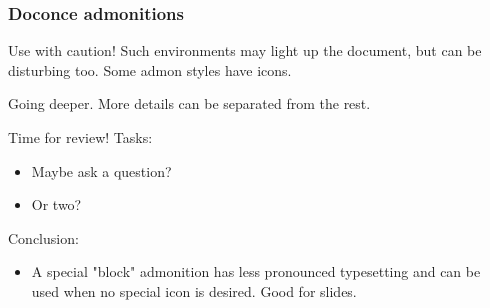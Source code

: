 \documentclass{beamer}
\newenvironment{graybox1admon}[1][]{\begin{block}{#1}}{\end{block}}
\begin{document}
\begin{frame}
\frametitle{Doconce admonitions}

\begin{graybox1admon}[Use with caution!]
Such environments may light up the document, but can be disturbing too.
Some admon styles have icons.
\end{graybox1admon}




\begin{graybox1admon}[Going deeper.]
More details can be separated from the rest.
\end{graybox1admon}




\begin{graybox1admon}[Time for review!]
Tasks:

\begin{itemize}
  \item Maybe ask a question?

  \item Or two?
\end{itemize}

\noindent
\end{graybox1admon}




\begin{graybox1admon}[]
Conclusion:

\begin{itemize}
  \item A special "block" admonition has less pronounced typesetting and
    can be used when no special icon is desired. Good for slides.
\end{itemize}

\noindent
\end{graybox1admon}
\end{frame}
\end{document}
